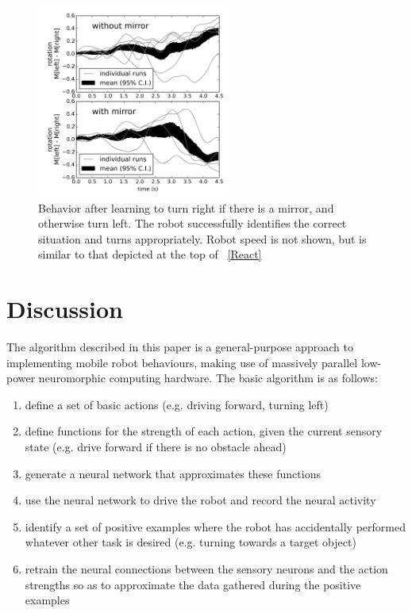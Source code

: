 \documentclass[conference]{IEEEtran}
\begin{document}
\begin{figure}[!t]
\centering
\includegraphics[width=2.5in]{learn-mirror/learnmirror.png}
\caption{Behavior after learning to turn right if there is a mirror, and otherwise turn left. The robot successfully identifies the correct situation and turns appropriately. Robot speed is not shown, but is similar to that depicted at the top of \figurename~\ref{React}}
\label{Right}
\end{figure}

\section{Discussion}
The algorithm described in this paper is a general-purpose approach to
implementing mobile robot behaviours, 
making use of massively parallel low-power neuromorphic computing hardware. 
The basic algorithm is as follows:

\begin{enumerate}
\item define a set of basic actions (e.g. driving forward, turning left)
\item define functions for the strength of each action, given the
current sensory state (e.g. drive forward if there is no obstacle ahead)
\item generate a neural network that approximates these functions
\item use the neural network to drive the robot and record the neural activity
\item identify a set of positive examples where the robot has accidentally
performed whatever other task is desired (e.g. turning towards a target object)
\item retrain the neural connections between the sensory neurons and the
action strengths so as to approximate the data gathered during the positive
examples
\end{enumerate}
\end{document}
